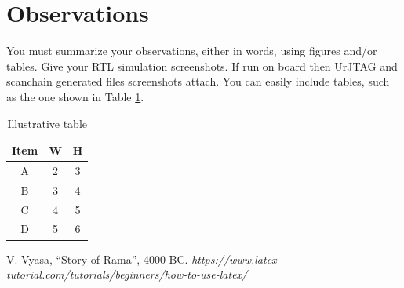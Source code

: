 \documentclass[12pt]{article}
\begin{document}
\section{Observations}

You must summarize your observations, either in words, using
figures and/or tables. Give your RTL simulation screenshots. If run on board then UrJTAG and scanchain generated files screenshots attach. 
%
%
You can easily include tables, such as the one shown in  Table \ref{table:demotable}.
\begin{table}
\centering  %
\begin{tabular}{|c | c c|} %
\hline  %
Item & W & H \\  %
\hline  %
A    & 2 & 3 \\  %
B    & 3 & 4 \\  %
C    & 4 & 5 \\  %
D    & 5 & 6 \\  %
\hline	%
\end{tabular}
\caption{Illustrative table}
\label{table:demotable}
\end{table}


%
% 
\begin{thebibliography}{99}
V. Vyasa, ``Story of Rama'', 4000 BC.
%
%
{\em https://www.latex-tutorial.com/tutorials/beginners/how-to-use-latex/}

\end{thebibliography}
\end{document}
